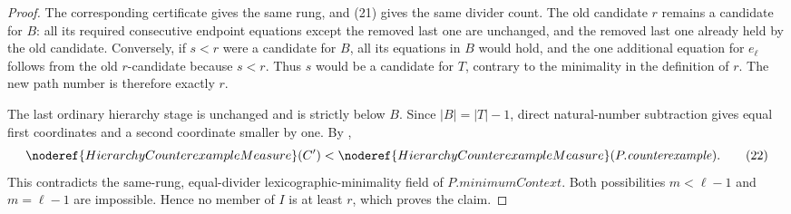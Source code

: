 \begin{proof}
The corresponding certificate gives the same rung, and (21) gives the same
divider count.  The old candidate \(r\) remains a candidate for \(B\): all
its required consecutive endpoint equations except the removed last one
are unchanged, and the removed last one already held by the old candidate.
Conversely, if \(s<r\) were a candidate for \(B\), all its equations in
\(B\) would hold, and the one additional equation for \(e_\ell\) follows
from the old \(r\)-candidate because \(s<r\).  Thus \(s\) would be a
candidate for \(T\), contrary to the minimality in the definition of \(r\).
The new path number is therefore exactly \(r\).

The last ordinary hierarchy stage is unchanged and is strictly below
\(B\).  Since \(|B|=|T|-1\), direct natural-number subtraction gives equal
first coordinates and a second coordinate smaller by one.  By
,
\[
 \noderef{HierarchyCounterexampleMeasure}(C')
   <\noderef{HierarchyCounterexampleMeasure}
          (P.\mathit{counterexample}).                         \tag{22}
\]
This contradicts the same-rung, equal-divider lexicographic-minimality
field of \(P.\mathit{minimumContext}\).  Both possibilities
\(m<\ell-1\) and \(m=\ell-1\) are impossible.  Hence no member of \(I\) is
at least \(r\), which proves the claim.
\end{proof}
